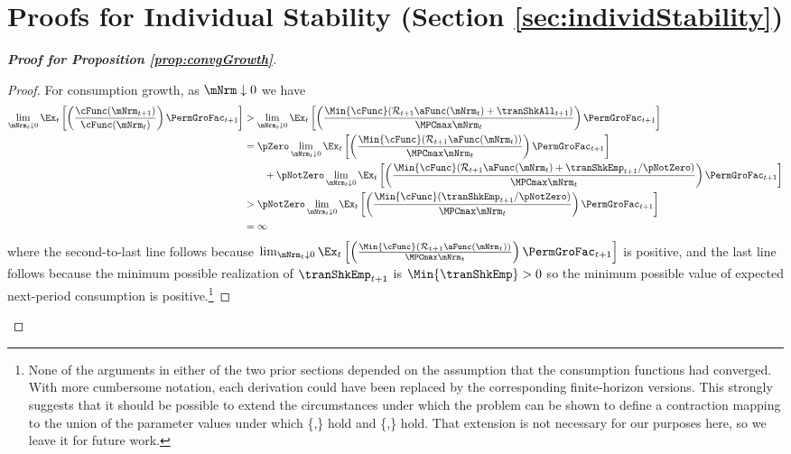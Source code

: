 \documentclass[\econtexRoot/BufferStockTheory]{subfiles}
\begin{document}

\hypertarget{ApndxMTargetIsStable}{}
\section{Proofs for Individual Stability (Section \ref{sec:individStability})}\label{sec:ApndxMTargetIsStable}

\begin{proof}[\textbf{Proof for Proposition \ref{prop:convgGrowth}}]

\begin{proof}
For consumption growth, as $\mNrm \downarrow 0$ we have
\begin{align*}
  \lim_{\mNrm_{t} \downarrow 0} \Ex_{t}\left[\left(\frac{\cFunc({\mNrm}_{t+1})}{\cFunc(\mNrm_t)}\right){\PermGroFac}_{t+1}\right]
  & > \lim_{\mNrm_{t} \downarrow 0} \Ex_{t}\left[\left(\frac{\Min{\cFunc}({\mathcal{\mathcal{R}}}_{t+1}\aFunc(\mNrm_{t})+{%
    \tranShkAll}_{t+1})}{\MPCmax \mNrm_{t}}\right){\PermGroFac}_{t+1}\right]  \notag \\
  & = \pZero \lim_{\mNrm_{t} \downarrow 0} \Ex_{t}\left[\left(\frac{\Min{\cFunc}({\mathcal{\mathcal{R}}}_{t+1}\aFunc(\mNrm_{t}))}{\MPCmax \mNrm_{t}}\right){\PermGroFac}_{t+1}\right] \\
  & ~~~~~~ + \pNotZero \lim_{\mNrm_{t} \downarrow 0}  \Ex_{t}\left[\left(\frac{\Min{\cFunc}({\mathcal{\mathcal{R}}}_{t+1}\aFunc(\mNrm_{t})+
    \tranShkEmp_{t+1}/\pNotZero)}{\MPCmax \mNrm_{t}}\right){\PermGroFac}_{t+1}\right]  \\\notag
  & > \pNotZero \lim_{\mNrm_{t} \downarrow 0} \Ex_{t}\left[\left(\frac{\Min{\cFunc}(
    \tranShkEmp_{t+1}/\pNotZero)}{\MPCmax \mNrm_{t}}\right){\PermGroFac}_{t+1}\right] \\
  & = \infty \nonumber
\end{align*}
where the second-to-last line follows because  $\lim_{\mNrm_{t} \downarrow 0} \Ex_{t}\left[\left(\frac{\Min{\cFunc}({\mathcal{\mathcal{R}}}_{t+1}\aFunc(\mNrm_{t}))}{\MPCmax \mNrm_{t}}\right){\PermGroFac}_{t+1}\right]$ is positive, and the last line follows because the minimum possible realization of $\tranShkEmp_{t+1}$ is $\Min{\tranShkEmp}>0$ so the minimum possible value of expected next-period consumption is positive.\footnote{None of the arguments in either of the two prior sections depended on the assumption that the consumption functions had converged.
With more cumbersome notation, each derivation could have been replaced by the corresponding finite-horizon versions.
This strongly suggests that it should be possible to extend the circumstances under which the problem can be shown to define a contraction mapping to the union of the parameter values under which \{\RIC,\FHWC\} hold and \{\FVAC,\WRIC\} hold.
That extension is not necessary for our purposes here, so we leave it for future work.}


\end{proof}
\end{proof}
\end{document}
